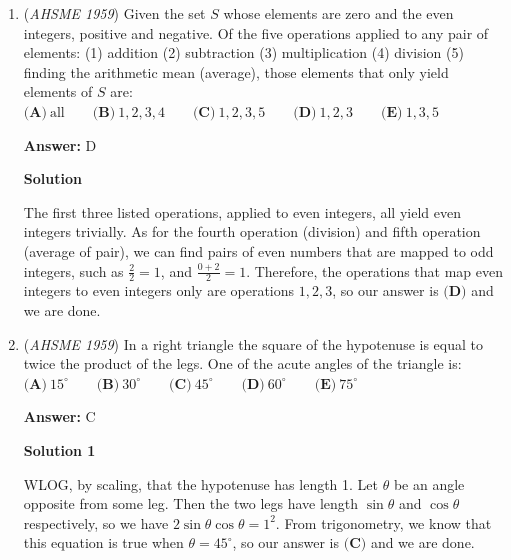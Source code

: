 \begin{enumerate}
Since the arithmetic mean of the $50$ numbers is $38$, their sum must be $50*38 = 1900$. After $45$ and $55$ are discarded, the sum decreases by $45 + 55 = 100$, so it must become $1900 - 100 = 1800$. But this means that the new mean of the remaining $50 - 2 = 48$ numbers must be $\frac{1800}{48} = 37.5$. Thusly, our answer is $\boxed{\textbf{(D)}}$, and we are done.

 


	\item (\textit{AHSME 1959}) Given the set $S$ whose elements are zero and the even integers, positive and negative. 
Of the five operations applied to any pair of elements: (1) addition (2) subtraction 
(3) multiplication (4) division (5) finding the arithmetic mean (average), those elements that only yield elements of $S$ are:
$\textbf{(A)}\ \text{all} \qquad\textbf{(B)}\ 1,2,3,4\qquad\textbf{(C)}\ 1,2,3,5\qquad\textbf{(D)}\ 1,2,3\qquad\textbf{(E)}\ 1,3,5$

 \textbf{Answer: }D



\textbf{Solution}

The first three listed operations, applied to even integers, all yield even integers trivially. As for the fourth operation (division) and fifth operation (average of pair), we can find pairs of even numbers that are mapped to odd integers, such as $\frac{2}{2} = 1$, and $\frac{0+2}{2} = 1$. Therefore, the operations that map even integers to even integers only are operations $1, 2, 3$, so our answer is $\boxed{\textbf{(D)}}$ and we are done.

 


	\item (\textit{AHSME 1959}) In a right triangle the square of the hypotenuse is equal to twice the product of the legs. One of the acute angles of the triangle is:
$\textbf{(A)}\ 15^{\circ} \qquad\textbf{(B)}\ 30^{\circ} \qquad\textbf{(C)}\ 45^{\circ} \qquad\textbf{(D)}\ 60^{\circ}\qquad\textbf{(E)}\ 75^{\circ}$

 \textbf{Answer: }C



\textbf{Solution 1}

WLOG, by scaling, that the hypotenuse has length 1. Let $\theta$ be an angle opposite from some leg. Then the two legs have length $\sin\theta$ and $\cos\theta$ respectively, so we have $2\sin\theta\cos\theta = 1^2$. From trigonometry, we know that this equation is true when $\theta = 45^{\circ}$, so our answer is $\boxed{\textbf{(C)}}$ and we are done.


\end{enumerate}

